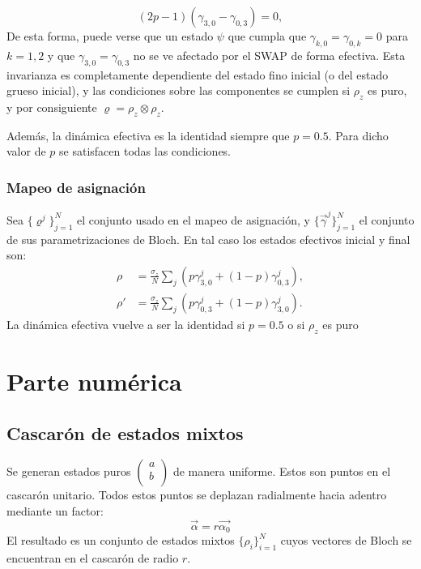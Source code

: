 \begin{equation*}
(2p-1)(\gamma_{3,0}-\gamma_{0,3})=0,
\end{equation*}
De esta forma, puede verse que un estado $\psi$ que cumpla que $\gamma_{k,0}=\gamma_{0,k}=0$ para $k=1,2$ y que $\gamma_{3,0}=\gamma_{0,3}$ no se ve afectado por el SWAP de forma efectiva. Esta invarianza es completamente dependiente del estado fino inicial (o del estado grueso inicial), y las condiciones sobre las componentes se cumplen  si $\rho_{z}$ es puro, y por consiguiente $\varrho=\rho_{z}\otimes\rho_{z}$.

Además, la dinámica efectiva es la identidad siempre que $p=0.5$. Para dicho valor de $p$ se satisfacen todas las condiciones.

\subsubsection{Mapeo de asignación}

Sea $\{\varrho^{j}\}_{j=1}^{N}$ el conjunto usado en el mapeo de asignación, y $\{\vec{\gamma}^{j}\}_{j=1}^{N}$ el conjunto de sus parametrizaciones de Bloch. En tal caso los estados efectivos inicial y final son:
\begin{align}
\rho&=\frac{\sigma_{z}}{N}\sum_{j}(p\gamma_{3,0}^{j}+(1-p)\gamma_{0,3}^{j}),\\
\rho'&=\frac{\sigma_{z}}{N}\sum_{j}(p\gamma_{0,3}^{j}+(1-p)\gamma_{3,0}^{j}).
\end{align}
La dinámica efectiva vuelve a ser la identidad si $p=0.5$ o si $\rho_{z}$ es puro


\newpage


\section{Parte numérica}
\subsection{Cascarón de estados mixtos}
Se generan estados puros $\begin{pmatrix}
a\\
b\\ \end{pmatrix}$ de manera uniforme. Estos son puntos en el cascarón unitario. Todos estos puntos se deplazan radialmente hacia adentro mediante un factor:
\begin{equation}
\vec{\alpha}=r\vec{\alpha_{0}}
\end{equation}
El resultado es un conjunto de estados mixtos $\{\rho_{i}\}_{i=1}^{N}$ cuyos vectores de Bloch se encuentran en el cascarón de radio $r$.

